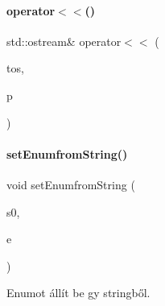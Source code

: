 \mbox{\label{_parts_8cpp_a1e49a5684d214884445782cc35228aea}} 
\paragraph{\texorpdfstring{operator$<$$<$()}{operator<<()}\hspace{0.1cm}{\footnotesize\ttfamily [40/40]}}
{\footnotesize\ttfamily std\+::ostream\& operator$<$$<$ (\begin{DoxyParamCaption}\item[{\mbox{\hyperlink{structtyp__ostream}{typ\+\_\+ostream}}}]{tos,  }\item[{const \mbox{\hyperlink{class_h_d_d}{H\+DD}} \&}]{p }\end{DoxyParamCaption})}

\mbox{\label{_parts_8cpp_a63d667335dd064350b67cadf16011241}} 
\paragraph{\texorpdfstring{setEnumfromString()}{setEnumfromString()}}
{\footnotesize\ttfamily void set\+Enumfrom\+String (\begin{DoxyParamCaption}\item[{\mbox{\hyperlink{class_string}{String}}}]{s0,  }\item[{\mbox{\hyperlink{_parts_8h_abddff37837f171d72a2e16a1448a3943}{enum\+Part}} \&}]{e }\end{DoxyParamCaption})}



Enumot állít be gy stringből. 

